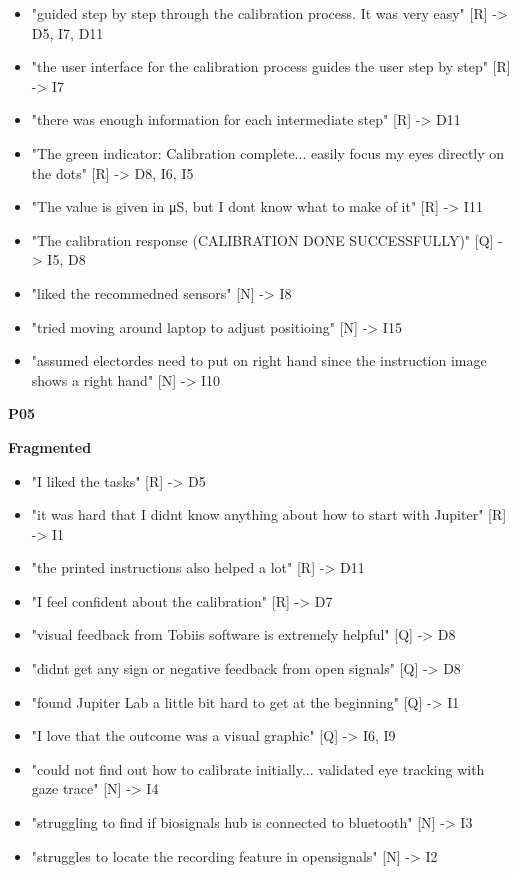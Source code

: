 \documentclass[
]{article}
\begin{document}
\begin{itemize}
\item
  "guided step by step through the calibration process. It was very easy" {[}R{]} -\textgreater{} D5, I7, D11
\item
  "the user interface for the calibration process guides the user step by step" {[}R{]} -\textgreater{} I7
\item
  "there was enough information for each intermediate step" {[}R{]} -\textgreater{} D11
\item
  "The green indicator: Calibration complete... easily focus my eyes directly on the dots" {[}R{]} -\textgreater{} D8, I6, I5
\item
  "The value is given in μS, but I don\textquotesingle t know what to make of it" {[}R{]} -\textgreater{} I11
\item
  "The calibration response (CALIBRATION DONE SUCCESSFULLY)" {[}Q{]} -\textgreater{} I5, D8
\item
  "liked the recommedned sensors" {[}N{]} -\textgreater{} I8
\item
  "tried moving around laptop to adjust positioing" {[}N{]} -\textgreater{} I15
\item
  "assumed electordes need to put on right hand since the instruction image shows a right hand" {[}N{]} -\textgreater{} I10
\end{itemize}


\textbf{P05}

\textbf{Fragmented}

\begin{itemize}
\item
  "I liked the tasks" {[}R{]} -\textgreater{} D5
\item
  "it was hard that I didn\textquotesingle t know anything about how to start with Jupiter" {[}R{]} -\textgreater{} I1
\item
  "the printed instructions also helped a lot" {[}R{]} -\textgreater{} D11
\item
  "I feel confident about the calibration" {[}R{]} -\textgreater{} D7
\item
  "visual feedback from Tobii\textquotesingle s software is extremely helpful" {[}Q{]} -\textgreater{} D8
\item
  "didn\textquotesingle t get any sign or negative feedback from open signals" {[}Q{]} -\textgreater{} D8
\item
  "found Jupiter Lab a little bit hard to get at the beginning" {[}Q{]} -\textgreater{} I1
\item
  "I love that the outcome was a visual graphic" {[}Q{]} -\textgreater{} I6, I9
\item
  "could not find out how to calibrate initially... validated eye tracking with gaze trace" {[}N{]} -\textgreater{} I4
\item
  "struggling to find if biosignals hub is connected to bluetooth" {[}N{]} -\textgreater{} I3
\item
  "struggles to locate the recording feature in opensignals" {[}N{]} -\textgreater{} I2
\end{itemize}
\end{document}
